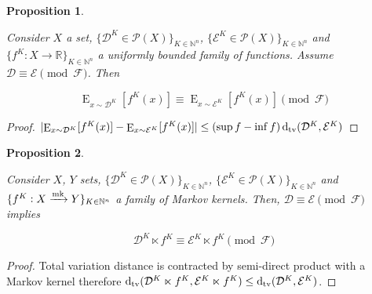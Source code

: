 \documentclass[11pt]{article}
\numberwithin{equation}{section}
\theoremstyle{definition}
\theoremstyle{plain}
\newtheorem{proposition}{Proposition}[section]
\DeclareMathOperator{\E}{E}
\newcommand{\Dtv}{\operatorname{d}_{\textnormal{tv}}}
\newcommand{\Nats}{\mathbb{N}}
\newcommand{\Reals}{\mathbb{R}}
\newcommand{\Abs}[1]{\lvert #1 \rvert}
\newcommand{\Dist}{\mathcal{D}}
\newcommand{\Fall}{\mathcal{F}}
\newcommand{\Markov}{\xrightarrow{\textnormal{mk}}}
\begin{document}
\begin{samepage}
\begin{proposition}
\label{prp:prob_cong_ev}

Consider $X$ a set, $\{\Dist^K \in \mathcal{P}(X)\}_{K \in \Nats^n}$, $\{\mathcal{E}^K \in \mathcal{P}(X)\}_{K \in \Nats^n}$ and\\ $\{f^K: X \rightarrow \Reals\}_{K \in \Nats^n}$ a uniformly bounded family of functions. Assume ${\Dist \equiv \mathcal{E} \pmod \Fall}$. Then

\begin{equation}
\E_{x \sim \Dist^K}[f^K(x)] \equiv \E_{x \sim \mathcal{E}^K}[f^K(x)] \pmod \Fall
\end{equation}

\end{proposition}
\end{samepage}

\begin{proof}

$\Abs{\E_{x \sim \Dist^K}[f^K(x)] - \E_{x \sim \mathcal{E}^K}[f^K(x)]} \leq  (\sup f - \inf f)\Dtv(\Dist^K, \mathcal{E}^K)$
\end{proof}

\begin{samepage}
\begin{proposition}
\label{prp:prob_cong_semidir}

Consider $X$, $Y$ sets, $\{\Dist^K \in \mathcal{P}(X)\}_{K \in \Nats^n}$, $\{\mathcal{E}^K \in \mathcal{P}(X)\}_{K \in \Nats^n}$ and\\ $\{f^K: X \Markov Y\}_{K \in \Nats^n}$ a family of Markov kernels. Then, $\Dist \equiv \mathcal{E} \pmod \Fall$ implies

\begin{equation}
\Dist^K \ltimes f^K \equiv \mathcal{E}^K \ltimes f^K \pmod \Fall
\end{equation}

\end{proposition}
\end{samepage}

\begin{proof}

Total variation distance is contracted by semi-direct product with a Markov kernel therefore $\Dtv(\Dist^K \ltimes f^K, \mathcal{E}^K \ltimes f^K) \leq \Dtv(\Dist^K, \mathcal{E}^K)$.
\end{proof}
\end{document}
